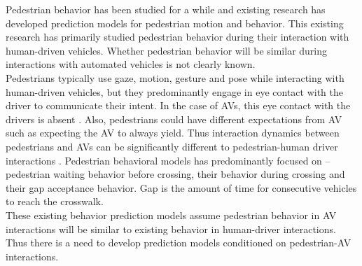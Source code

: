 \documentclass[letter,journal]{IEEEtran}
\begin{document}
Pedestrian behavior has been studied for a while and existing research has developed prediction models for pedestrian motion and behavior. This existing research has primarily studied pedestrian behavior during their interaction with human-driven vehicles. Whether pedestrian behavior will be similar during interactions with automated vehicles is not clearly known.\\

Pedestrians typically use gaze, motion, gesture and pose while interacting with human-driven vehicles, but they predominantly engage in eye contact with the driver to communicate their intent. In the case of AVs, this eye contact with the drivers is absent \cite{rasouli2019autonomous}. Also, pedestrians could have different expectations from AV such as expecting the AV to always yield. Thus interaction dynamics between pedestrians and AVs can be significantly different to pedestrian-human driver interactions \cite{rasouli2019autonomous}. Pedestrian behavioral models has predominantly focused on -- pedestrian waiting behavior before crossing, their behavior during crossing and their gap acceptance behavior. Gap is the amount of time for consecutive vehicles to reach the crosswalk. \\

These existing behavior prediction models assume pedestrian behavior in AV interactions will be similar to existing behavior in human-driver interactions. Thus there is a need to develop prediction models conditioned on pedestrian-AV interactions.




\end{document}
